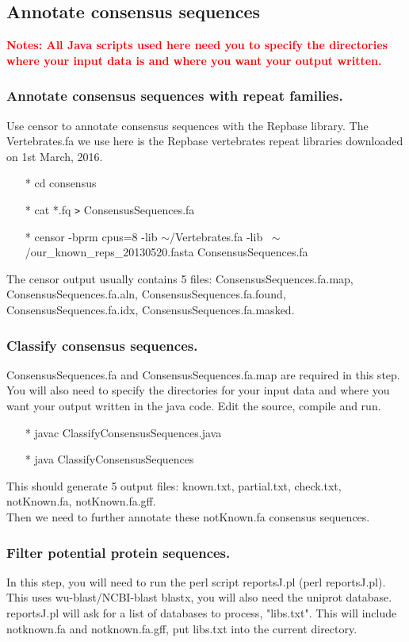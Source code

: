 \documentclass[12pt]{report}
\begin{document}
\subsection{Annotate consensus sequences}
\textbf{\textcolor{red}{Notes: All Java scripts used here need you to specify the directories where your input data is and where you want your output written. }}

\subsubsection{Annotate consensus sequences with repeat families.}
Use censor to annotate consensus sequences with the Repbase library. The Vertebrates.fa we use here is the Repbase vertebrates repeat libraries downloaded on 1st March, 2016. 
\begin{enumerate}
	\item[*] cd consensus
	\item[*] cat *.fq \texttt{>} ConsensusSequences.fa 
	\item[*] censor -bprm cpus=8 -lib $\sim$/Vertebrates.fa -lib ~$\sim$/our\_known\_reps\_20130520.fasta ConsensusSequences.fa 
\end{enumerate}
The censor output usually contains 5 files: ConsensusSequences.fa.map, ConsensusSequences.fa.aln, ConsensusSequences.fa.found, ConsensusSequences.fa.idx, ConsensusSequences.fa.masked.  \\

\subsubsection{Classify consensus sequences.}
ConsensusSequences.fa and ConsensusSequences.fa.map are required in this step. You will also need to specify the directories for your input data and where you want your output written in the java code. Edit the source, compile and run.\\
\begin{enumerate}
	\item[*] javac ClassifyConsensusSequences.java
	\item[*] java ClassifyConsensusSequences
\end{enumerate}
This should generate 5 output files: known.txt, partial.txt, check.txt, notKnown.fa, notKnown.fa.gff. \\
Then we need to further annotate these notKnown.fa consensus sequences. 

\subsubsection{Filter potential protein sequences.}
In this step, you will need to run the perl script reportsJ.pl (perl reportsJ.pl). This uses wu-blast/NCBI-blast blastx, you will also need the uniprot database. reportsJ.pl will ask for a list of databases to process, "libs.txt". This will include notknown.fa and notknown.fa.gff, put libs.txt into the current directory. \\
\end{document}
